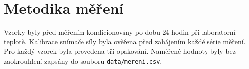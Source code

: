 \section{Metodika měření}

Vzorky byly před měřením kondicionovány po dobu 24 hodin při laboratorní teplotě.
Kalibrace snímače síly byla ověřena před zahájením každé série měření. Pro každý
vzorek byla provedena tři opakování. Naměřené hodnoty byly bez zaokrouhlení zapsány
do souboru \texttt{data/mereni.csv}.
